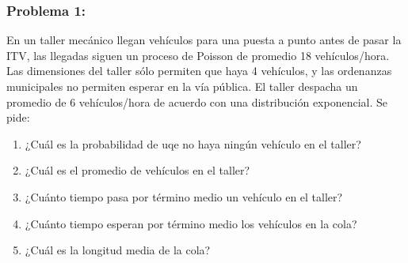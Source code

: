 \documentclass{templateNote}
\begin{document}
\subsubsection{Problema 1:}
En un taller mec\'anico llegan veh\'iculos para una puesta a punto antes de pasar la ITV, las llegadas siguen un proceso de Poisson de promedio 18 veh\'iculos/hora. Las dimensiones del taller s\'olo permiten que haya 4 veh\'iculos, y las ordenanzas municipales no permiten esperar en la v\'ia p\'ublica. El taller despacha un promedio de 6 veh\'iculos/hora de acuerdo con una distribuci\'on exponencial. Se pide:
\begin{enumerate}
    \item ¿Cu\'al es la probabilidad de uqe no haya ning\'un veh\'iculo en el taller?
    
    \item ¿Cu\'al es el promedio de veh\'iculos en el taller?
    
    \item ¿Cu\'anto tiempo pasa por t\'ermino medio un veh\'iculo en el taller?
    
    \item ¿Cu\'anto tiempo esperan por t\'ermino medio los veh\'iculos en la cola?
    
    \item ¿Cu\'al es la longitud media de la cola?
\end{enumerate}
\newpage
\end{document}
